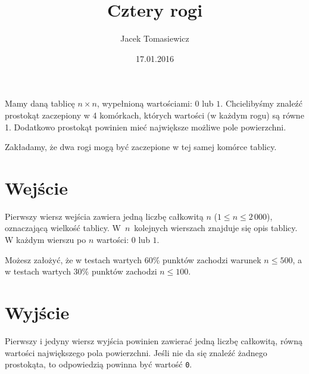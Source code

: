 \documentclass[zad,zawodnik,utf8]{sinol}
\title{Cztery rogi}
\author{Jacek Tomasiewicz} %
\date{17.01.2016}
\begin{document}
  \begin{tasktext}%
Mamy daną tablicę $n \times n$, wypełnioną wartościami: $0$ lub $1$. 
Chcielibyśmy znaleźć  prostokąt zaczepiony w 4 komórkach, których wartości (w każdym rogu) są równe 1. 
Dodatkowo prostokąt powinien mieć największe możliwe pole powierzchni.

Zakładamy, że dwa rogi mogą być zaczepione w tej samej komórce tablicy.

 \section{Wejście}
	
Pierwszy wiersz wejścia zawiera jedną liczbę całkowitą $n$ ($1 \leq n \leq 2\,000$),  
oznaczającą wielkość tablicy. W~$n$~kolejnych wierszach znajduje się opis tablicy. 
W każdym wierszu po $n$ wartości: $0$ lub $1$.

Możesz założyć, że w testach wartych $60\%$ punktów zachodzi warunek $n \leq 500$, 
a w testach wartych $30\%$ punktów zachodzi $n \leq 100$.

  \section{Wyjście}
	Pierwszy i jedyny wiersz wyjścia powinien zawierać jedną liczbę całkowitą, równą wartości największego pola powierzchni.
	Jeśli nie da się znaleźć żadnego prostokąta, to odpowiedzią powinna być wartość \texttt{0}.

     \makecompactexample

  \end{tasktext}
\end{document}
